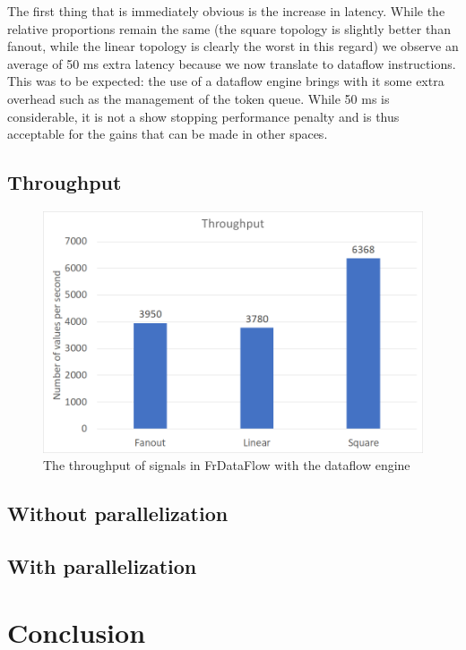 The first thing that is immediately obvious is the increase in latency. While the relative proportions remain the same (the square topology is slightly better than fanout, while the linear topology is clearly the worst in this regard) we observe an average of 50 ms extra latency because we now translate to dataflow instructions. This was to be expected: the use of a dataflow engine brings with it some extra overhead such as the management of the token queue. While 50 ms is considerable, it is not a show stopping performance penalty and is thus acceptable for the gains that can be made in other spaces.

\subsection{Throughput}

\begin{figure}[h]
	\includegraphics[width=\textwidth]{images/Evaluation-WithDataFlow-Throughput.png}
	\caption{The throughput of signals in FrDataFlow with the dataflow engine}
	\label{fig:evaluation-withdataflow-throughput}
\end{figure}

\subsection{Without parallelization}

\subsection{With parallelization}

\section{Conclusion}

